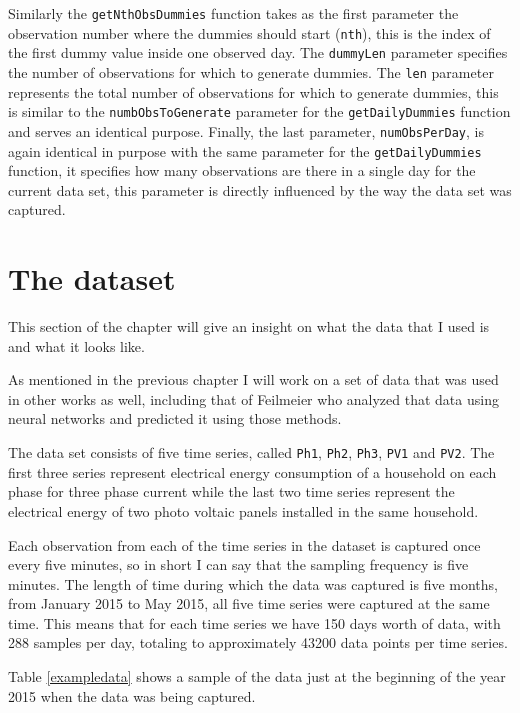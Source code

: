 \documentclass[12pt,a4paper,titlepage]{report}
\begin{document}
Similarly the \texttt{getNthObsDummies} function takes as the first parameter the observation number where the dummies should start (\texttt{nth}), this is the index of the first dummy value inside one observed day. The \texttt{dummyLen} parameter specifies the number of observations for which to generate dummies. The \texttt{len} parameter represents the total number of observations for which to generate dummies, this is similar to the   \texttt{numbObsToGenerate} parameter for the \texttt{getDailyDummies} function and serves an identical purpose. Finally, the last parameter, \texttt{numObsPerDay}, is again identical in purpose with the same parameter for the \texttt{getDailyDummies} function, it specifies how many observations are there in a single day for the current data set, this parameter is directly influenced by the way the data set was captured.

\section{The dataset}
This section of the chapter will give an insight on what the data that I used is and what it looks like.

As mentioned in the previous chapter I will work on a set of data that was used in other works as well, including that of Feilmeier \cite{feilmeier} who analyzed that data using neural networks and predicted it using those methods.

The data set consists of five time series, called \texttt{Ph1}, \texttt{Ph2}, \texttt{Ph3}, \texttt{PV1} and \texttt{PV2}.
The first three series represent electrical energy consumption of a household on each phase for three phase current while the last two time series represent the electrical energy of two photo voltaic panels installed in the same household.

Each observation from each of the time series in the dataset is captured once every five minutes, so in short I can say that the sampling frequency is five minutes.
The length of time during which the data was captured is five months, from January 2015 to May 2015, all five time series were captured at the same time. This means that for each time series we have 150 days worth of data, with 288 samples per day,  totaling to approximately 43200 data points per time series.

Table \ref{exampledata} shows a sample of the data just at the beginning of the year 2015 when the data was being captured.
\end{document}
